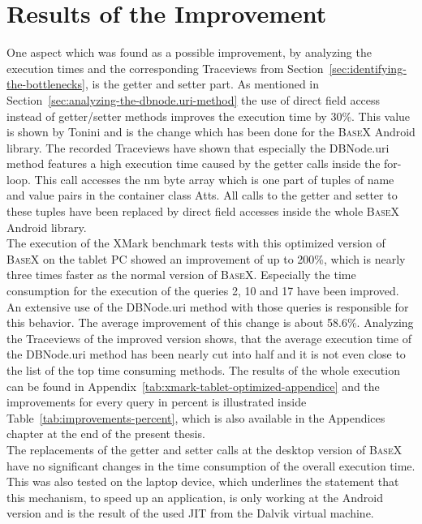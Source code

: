 \section{Results of the Improvement}
\label{sec:improving}
One aspect which was found as a possible improvement, by analyzing the execution times and the corresponding Traceviews from Section~\ref{sec:identifying-the-bottlenecks}, is the getter and setter part.
As mentioned in Section~\ref{sec:analyzing-the-dbnode.uri-method} the use of direct field access instead of getter/setter methods improves the execution time by 30\%.
This value is shown by Tonini\cite{toninievlautatingandroid} and is the change which has been done for the \textsc{BaseX} Android library.
The recorded Traceviews have shown that especially the \textsf{DBNode.uri} method features a high execution time caused by the getter calls inside the for-loop.
This call accesses the \textsf{nm} byte array which is one part of tuples of name and value pairs in the container class \textsf{Atts}.
All calls to the getter and setter to these tuples have been replaced by direct field accesses inside the whole \textsc{BaseX} Android library.\\
The execution of the XMark benchmark tests with this optimized version of \textsc{BaseX} on the tablet PC showed an improvement of up to 200\%, which is nearly three times faster as the normal version of \textsc{BaseX}.
Especially the time consumption for the execution of the queries 2, 10 and 17 have been improved.
An extensive use of the \textsf{DBNode.uri} method with those queries is responsible for this behavior.
The average improvement of this change is about 58.6\%.
Analyzing the Traceviews of the improved version shows, that the average execution time of the \textsf{DBNode.uri} method has been nearly cut into half and it is not even close to the list of the top time consuming methods.
The results of the whole execution can be found in Appendix~\ref{tab:xmark-tablet-optimized-appendice} and the improvements for every query in percent is illustrated inside Table~\ref{tab:improvements-percent}, which is also available in the Appendices chapter at the end of the present thesis.\\
The replacements of the getter and setter calls at the desktop version of \textsc{BaseX} have no significant changes in the time consumption of the overall execution time.
This was also tested on the laptop device, which underlines the statement that this mechanism, to speed up an application, is only working at the Android version and is the result of the used JIT from the Dalvik virtual machine.
